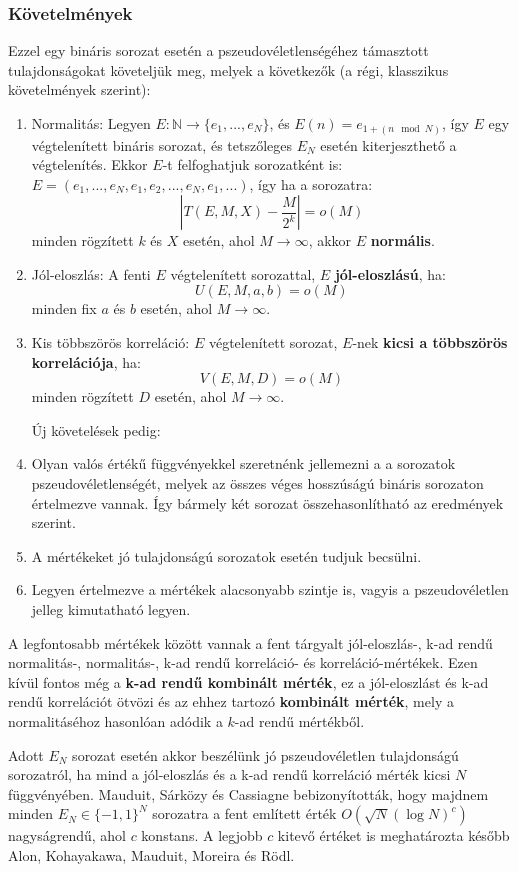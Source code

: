 \documentclass[12pt]{article}
\begin{document}
	\subsubsection*{Követelmények}
	Ezzel egy bináris sorozat esetén a pszeudovéletlenségéhez támasztott tulajdonságokat követeljük meg, melyek a következők (a régi, klasszikus követelmények szerint):
	\begin{enumerate}
		\bfseries \item Normalitás:
		\normalfont	Legyen $E: \mathbb{N} \to \{e_1, ..., e_N\}$, és $E(n) = e_{1+(n \mod N)}$, így $E$ egy végtelenített bináris sorozat, és tetszőleges $E_N$ esetén kiterjeszthető a végtelenítés. Ekkor $E$-t felfoghatjuk sorozatként is: $E=(e_1, ..., e_N, e_1, e_2, ..., e_N, e_1, ...)$, így ha a sorozatra:
		$$\left|T(E, M, X) - \frac{M}{2^k}\right| = o(M)$$
		minden rögzített $k$ és $X$ esetén, ahol $M \to \infty$, akkor $E$ \textbf{normális}.
		\par
		\bfseries \item Jól-eloszlás:
		\normalfont A fenti $E$ végtelenített sorozattal, $E$ \textbf{jól-eloszlású}, ha:
		$$U(E, M, a, b) = o (M)$$
		minden fix $a$ és $b$ esetén, ahol $M \to \infty$.
		\bfseries \item Kis többszörös korreláció:
		\normalfont $E$ végtelenített sorozat, $E$-nek \textbf{kicsi a többszörös korrelációja}, ha:
		$$V(E, M, D) = o(M)$$
		minden rögzített $D$ esetén, ahol $M \to \infty$. \par
		Új követelések pedig:
		\item Olyan valós értékű függvényekkel szeretnénk jellemezni a a sorozatok pszeudovéletlenségét, melyek az összes véges hosszúságú bináris sorozaton értelmezve vannak. Így bármely két sorozat összehasonlítható az eredmények szerint.
		\item A mértékeket jó tulajdonságú sorozatok esetén tudjuk becsülni.
		\item Legyen értelmezve a mértékek alacsonyabb szintje is, vagyis a pszeudovéletlen jelleg kimutatható legyen. 
	\end{enumerate}
	A legfontosabb mértékek között vannak a fent tárgyalt jól-eloszlás-, k-ad rendű normalitás-, normalitás-, k-ad rendű korreláció- és korreláció-mértékek. Ezen kívül fontos még a \textbf{k-ad rendű kombinált mérték}, ez a jól-eloszlást és k-ad rendű korrelációt ötvözi és az ehhez tartozó \textbf{kombinált mérték}, mely a normalitáséhoz hasonlóan adódik a $k$-ad rendű mértékből.
	
	Adott $E_N$ sorozat esetén akkor beszélünk jó pszeudovéletlen tulajdonságú sorozatról, ha mind a jól-eloszlás és a k-ad rendű korreláció mérték kicsi $N$ függvényében. Mauduit, Sárközy és Cassiagne bebizonyították, hogy majdnem minden $E_N \in \{-1, 1\}^N$ sorozatra a fent említett érték $O(\sqrt{N}(\log{N})^c)$ nagyságrendű, ahol $c$ konstans. A legjobb $c$ kitevő értéket is meghatározta később Alon, Kohayakawa, Mauduit, Moreira és Rödl. \cite{cvalue} 
\end{document}
